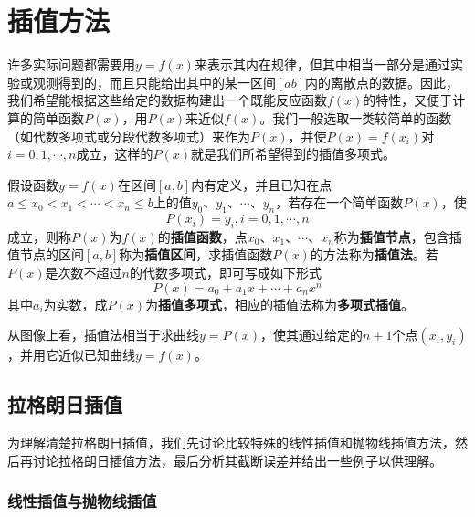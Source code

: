 \chapter{插值方法}
许多实际问题都需要用$y=f(x)$来表示其内在规律，但其中相当一部分是通过实验或观测得到的，而且只能给出其中的某一区间$[ab]$内的离散点的数据。因此，我们希望能根据这些给定的数据构建出一个既能反应函数$f(x)$的特性，又便于计算的简单函数$P(x)$，用$P(x)$来近似$f(x)$。我们一般选取一类较简单的函数（如代数多项式或分段代数多项式）来作为$P(x)$，并使$P(x)=f(x_i)$对$i=0,1,\cdots,n$成立，这样的$P(x)$就是我们所希望得到的插值多项式。

假设函数$y=f(x)$在区间$[a,b]$内有定义，并且已知在点$a \leqslant x_0 < x_1 < \cdots < x_n \leqslant b$上的值$y_0$、$y_1$、$\cdots$、$y_n$，若存在一个简单函数$P(x)$，使
\begin{equation}
    P(x_i) = y_i,	i=0,1,\cdots,n
\end{equation} 
成立，则称$P(x)$为$f(x)$的\textbf{插值函数}，点$x_0$、$x_1$、$\cdots$、$x_n$称为\textbf{插值节点}，包含插值节点的区间$[a,b]$称为\textbf{插值区间}，求插值函数$P(x)$的方法称为\textbf{插值法}。若$P(x)$是次数不超过$n$的代数多项式，即可写成如下形式
\begin{equation}
	P(x)=a_0 + a_1 x + \cdots + a_n x^n
\end{equation} 
其中$a_i$为实数，成$P(x)$为\textbf{插值多项式}，相应的插值法称为\textbf{多项式插值}。

从图像上看，插值法相当于求曲线$y=P(x)$，使其通过给定的$n+1$个点$(x_i, y_i)$，并用它近似已知曲线$y=f(x)$。
\section{拉格朗日插值}
为理解清楚拉格朗日插值，我们先讨论比较特殊的线性插值和抛物线插值方法，然后再讨论拉格朗日插值方法，最后分析其截断误差并给出一些例子以供理解。
\subsection{线性插值与抛物线插值}


